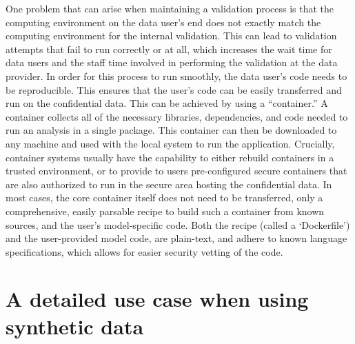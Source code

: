 \documentclass[]{hdsr}
\begin{document}
One problem that can arise when maintaining a validation process is that the 
computing environment on the data user's end does not exactly match the computing environment for
the internal validation. This can lead to validation attempts that fail to run correctly or at all, which
increases the wait time for data users and the staff time involved in performing the validation at the data provider. 
In order for this process to run smoothly, the data user's code needs to be reproducible.  This ensures that the user's code can be easily transferred and
run on the confidential data. This can be achieved by using a ``container.'' A container collects all of the
necessary libraries, dependencies, and code needed to run an analysis in a single
package. This container can then be downloaded to any machine and used with the local system to run
the application. Crucially, container systems usually have the capability to either rebuild containers in a trusted environment, or to provide to users pre-configured secure containers that are also authorized to run in the secure area hosting the confidential data. In most cases, the core container itself does not need to be transferred, only a comprehensive, easily parsable recipe to build such a container from known sources, and the user's model-specific code. Both the recipe (called a `Dockerfile') and the user-provided model code, are plain-text, and adhere to known language specifications, which allows for easier security vetting of the code.

\section{A detailed use case when using synthetic data}
\label{sec:usecase}
\end{document}
